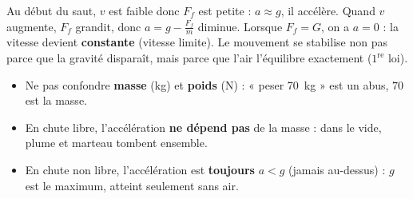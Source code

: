 \documentclass[11pt,a4paper]{article}
\begin{document}
\begin{exemplebox}
Au début du saut, $v$ est faible donc $F_f$ est petite : $a\approx g$, il accélère. Quand $v$ augmente,
$F_f$ grandit, donc $a=g-\tfrac{F_f}{m}$ diminue. Lorsque $F_f=G$, on a $a=0$ : la vitesse devient
\textbf{constante} (vitesse limite). Le mouvement se stabilise non pas parce que la gravité disparaît,
mais parce que l'air l'équilibre exactement ($1^{\text{re}}$ loi).
\end{exemplebox}

\begin{piege}
\begin{itemize}[leftmargin=1.4em,topsep=2pt,itemsep=1.5pt]
  \item Ne pas confondre \textbf{masse} (\si{\kilogram}) et \textbf{poids} (\si{\newton}) : « peser \qty{70}{\kilogram} » est un abus, $70$ est la masse.
  \item En chute libre, l'accélération \textbf{ne dépend pas} de la masse : dans le vide, plume et marteau tombent ensemble.
  \item En chute non libre, l'accélération est \textbf{toujours} $a<g$ (jamais au-dessus) : $g$ est le maximum, atteint seulement sans air.
\end{itemize}
\end{piege}
\end{document}
